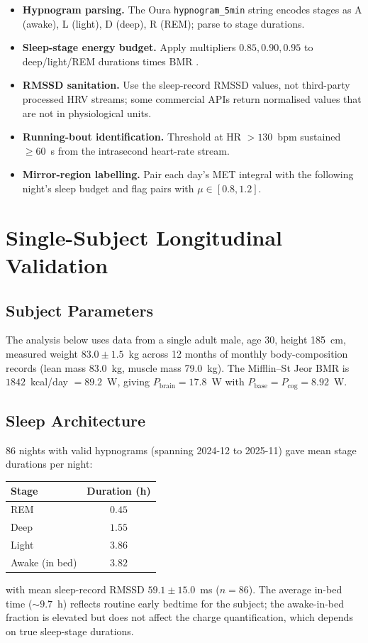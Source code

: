 \documentclass[11pt,twocolumn,a4paper]{article}
\theoremstyle{definition}
\theoremstyle{remark}
\newcommand{\Pbrain}{P_{\mathrm{brain}}}
\newcommand{\Pbase}{P_{\mathrm{base}}}
\newcommand{\Pcog}{P_{\mathrm{cog}}}
\begin{document}
\begin{itemize}[leftmargin=1.3em]
\item \textbf{Hypnogram parsing.} The Oura \texttt{hypnogram\_5min}
  string encodes stages as A (awake), L (light), D (deep), R (REM);
  parse to stage durations.
\item \textbf{Sleep-stage energy budget.} Apply multipliers
  $0.85, 0.90, 0.95$ to deep/light/REM durations times BMR
  \citep{jung2011}.
\item \textbf{RMSSD sanitation.} Use the sleep-record RMSSD values,
  not third-party processed HRV streams; some commercial APIs
  return normalised values that are not in physiological units.
\item \textbf{Running-bout identification.} Threshold at HR $>130$~bpm
  sustained $\ge 60$~s from the intrasecond heart-rate stream.
\item \textbf{Mirror-region labelling.} Pair each day's MET integral
  with the following night's sleep budget and flag pairs with
  $\mu\in[0.8,1.2]$.
\end{itemize}

\section{Single-Subject Longitudinal Validation}
\label{sec:results}

\subsection{Subject Parameters}

The analysis below uses data from a single adult male, age 30,
height 185~cm, measured weight $83.0\pm 1.5$~kg across 12 months of
monthly body-composition records (lean mass 83.0~kg, muscle mass
79.0~kg). The Mifflin--St Jeor BMR is
$1842$~kcal/day $= 89.2$~W, giving
$\Pbrain=17.8$~W with $\Pbase=\Pcog=8.92$~W.

\subsection{Sleep Architecture}

86 nights with valid hypnograms (spanning
2024-12 to 2025-11) gave mean stage durations per night:
\begin{center}
\begin{tabular}{lc}
\toprule
Stage & Duration (h) \\
\midrule
REM & $0.45$ \\
Deep & $1.55$ \\
Light & $3.86$ \\
Awake (in bed) & $3.82$ \\
\bottomrule
\end{tabular}
\end{center}
with mean sleep-record RMSSD $59.1\pm 15.0$~ms ($n=86$). The average
in-bed time ($\sim 9.7$~h) reflects routine early bedtime for the
subject; the awake-in-bed fraction is elevated but does not affect
the charge quantification, which depends on true sleep-stage
durations.
\end{document}
